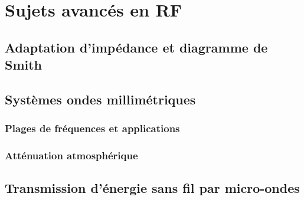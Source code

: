 \chapter{Sujets avancés en RF} \label{sec:advanced_rf}
\section{Adaptation d'impédance et diagramme de Smith} \label{subsec:impedance_matching}
\section{Systèmes ondes millimétriques} \label{subsec:mm_wave}
\subsection{Plages de fréquences et applications} \label{subsec:frequency_ranges}
\subsection{Atténuation atmosphérique} \label{subsec:atmospheric_attenuation}
\section{Transmission d'énergie sans fil par micro-ondes} \label{subsec:wireless_power}
